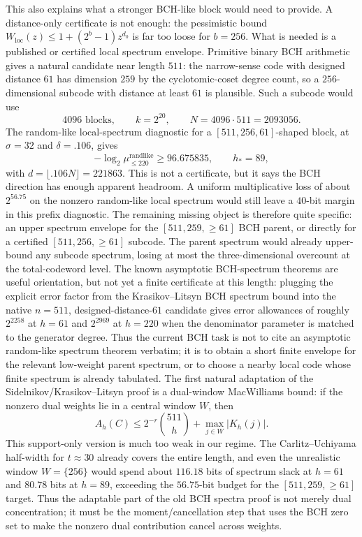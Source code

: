 This also explains what a stronger BCH-like block would need to provide.  A distance-only certificate is not enough:
the pessimistic bound \(W_{\mathrm{loc}}(z)\le 1+(2^b-1)z^{d_0}\) is far too loose for \(b=256\).  What is needed is a
published or certified local spectrum envelope.  Primitive binary BCH arithmetic gives a natural candidate near
length \(511\): the narrow-sense code with designed distance \(61\) has dimension \(259\) by the cyclotomic-coset
degree count, so a \(256\)-dimensional subcode with distance at least \(61\) is plausible.  Such a subcode would use
\[
4096\text{ blocks},\qquad k=2^{20},\qquad N=4096\cdot511=2093056.
\]
The random-like local-spectrum diagnostic for a \([511,256,61]\)-shaped block, at \(\sigma=32\) and \(\delta=.106\),
gives
\[
-\log_2\mu_{\le220}^{\mathrm{randlike}}\ge 96.675835,
\qquad h_*=89,
\]
with \(d=\lfloor .106N\rfloor=221863\).  This is not a certificate, but it says the BCH direction has enough apparent
headroom.  A uniform multiplicative loss of about \(2^{56.75}\) on the nonzero random-like local spectrum would still
leave a \(40\)-bit margin in this prefix diagnostic.  The remaining missing object is therefore quite specific: an
upper spectrum envelope for the
\([511,259,\ge61]\) BCH parent, or directly for a certified \([511,256,\ge61]\) subcode.  The parent spectrum would
already upper-bound any subcode spectrum, losing at most the three-dimensional overcount at the total-codeword level.
The known asymptotic BCH-spectrum theorems are useful orientation, but not yet a finite certificate at this length:
plugging the explicit error factor from the Krasikov--Litsyn BCH spectrum bound into the native \(n=511\),
designed-distance-\(61\) candidate gives error allowances of roughly \(2^{2258}\) at \(h=61\) and \(2^{2969}\) at
\(h=220\) when the denominator parameter is matched to the generator degree.  Thus the current BCH task is not to cite
an asymptotic random-like spectrum theorem verbatim; it is to obtain a short finite envelope for the relevant
low-weight parent spectrum, or to choose a nearby local code whose finite spectrum is already tabulated.
The first natural adaptation of the Sidelnikov/Krasikov--Litsyn proof is a dual-window MacWilliams bound: if the
nonzero dual weights lie in a central window \(W\), then
\[
A_h(C)\le 2^{-r}\binom{511}{h}+\max_{j\in W}|K_h(j)|.
\]
This support-only version is much too weak in our regime.  The Carlitz--Uchiyama half-width for \(t\approx30\) already
covers the entire length, and even the unrealistic window \(W=\{256\}\) would spend about \(116.18\) bits of spectrum
slack at \(h=61\) and \(80.78\) bits at \(h=89\), exceeding the \(56.75\)-bit budget for the
\([511,259,\ge61]\) target.  Thus the adaptable part of the old BCH spectra proof is not merely dual concentration; it
must be the moment/cancellation step that uses the BCH zero set to make the nonzero dual contribution cancel across
weights.

